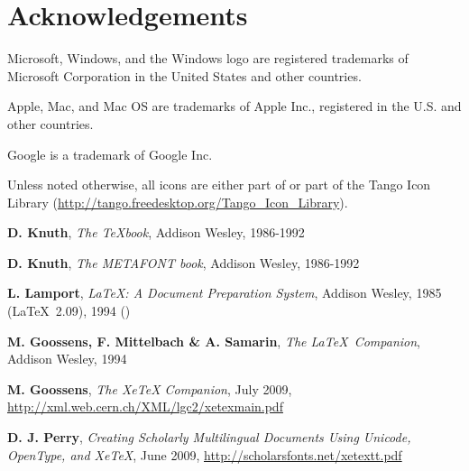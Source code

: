 
\chapter*{Acknowledgements}

Microsoft, Windows, and the Windows logo are registered trademarks of Microsoft Corporation in the United States and other countries.

Apple, Mac, and Mac OS are trademarks of Apple Inc., registered in the U.S. and other countries.

Google is a trademark of Google Inc.

Unless noted otherwise, all icons are either part of {\Tw} or part of the Tango Icon Library (\url{http://tango.freedesktop.org/Tango_Icon_Library}).

\begin{thebibliography}{xx}
\textbf{D. Knuth}, \textsl{The \TeX book}, Addison Wesley, 1986-1992

\textbf{D. Knuth}, \textsl{The METAFONT book}, Addison Wesley, 1986-1992

\textbf{L. Lamport}, \textsl{\LaTeX: A Document Preparation System}, Addison Wesley, 1985 (\LaTeX\ 2.09), 1994 (\LaTeXe)

\textbf{M. Goossens, F. Mittelbach \& A. Samarin}, \textsl{The \LaTeX\ Companion}, Addison Wesley, 1994

\textbf{M. Goossens}, \textsl{The XeTeX Companion}, July 2009, \url{http://xml.web.cern.ch/XML/lgc2/xetexmain.pdf}

\textbf{D. J. Perry}, \textsl{Creating Scholarly Multilingual Documents Using Unicode, OpenType, and XeTeX}, June 2009, \url{http://scholarsfonts.net/xetextt.pdf}

\end{thebibliography}

\printindex
